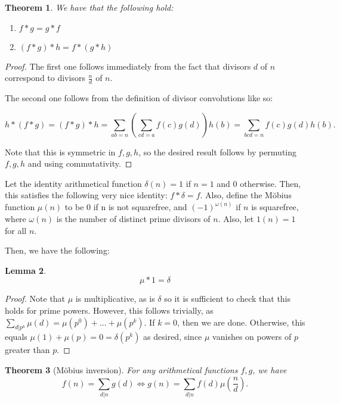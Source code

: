 \documentclass{article}
\theoremstyle{plain}
\newtheorem{theorem}{Theorem}
\newtheorem{lemma}[theorem]{Lemma}
\numberwithin{equation}{section}
\begin{document}
\begin{theorem} 

We have that the following hold: 

\begin{enumerate}
\item $f*g = g*f$
\item $(f*g)*h = f*(g*h)$
\end{enumerate}
\end{theorem}
\begin{proof}
The first one follows immediately from the fact that divisors $d$ of $n$ correspond to divisors $\frac{n}{d}$ of $n$.

The second one follows from the definition of divisor convolutions like so: 

$$h*(f*g) = (f*g)*h = \sum_{ab = n}\left(\sum_{cd = a}f(c)g(d)\right)h(b) = \sum_{bcd = n}f(c)g(d)h(b).$$

Note that this is symmetric in $f, g, h$, so the desired result follows by permuting $f, g, h$ and using commutativity.

\end{proof}

Let the identity arithmetical function $\delta(n) = 1$ if $n = 1$ and $0$ otherwise. Then, this satisfies the following very 
nice identity: $f*\delta = f$. Also, define the M\"obius function $\mu(n)$ to be $0$ if n is not squarefree, and $(-1)^{\omega(n)}$
if $n$ is squarefree, where $\omega(n)$ is the number of distinct prime divisors of $n$. Also, let $1(n) = 1$ for all $n$.

Then, we have the following:

\begin{lemma}
$$\mu * 1 = \delta$$
\end{lemma}

\begin{proof}
Note that $\mu$ is multiplicative, as is $\delta$ so it is sufficient to check that this holds for prime powers. However, this follows
trivially, as $\sum_{d|p^k}\mu(d) = \mu(p^0) +\dots + \mu(p^k)$. If $k = 0$, then we are done. Otherwise, this equals 
$\mu(1) + \mu(p) = 0 = \delta(p^k)$ as desired, since $\mu$ vanishes on powers of $p$ greater than $p$.
\end{proof}

\begin{theorem}[M\"obius inversion]
For any arithmetical functions $f,g$, we have
$$f(n) = \sum_{d|n}g(d) \iff g(n) = \sum_{d|n} f(d)\mu\left(\frac{n}{d}\right).$$

\end{theorem}
\end{document}
